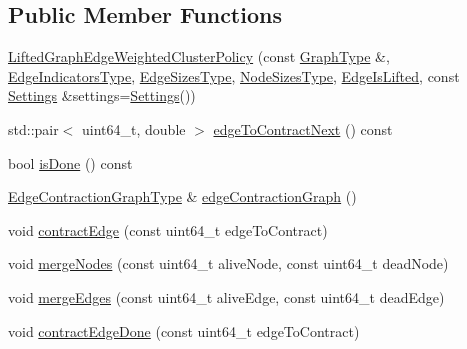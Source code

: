 \subsection*{Public Member Functions}
\begin{DoxyCompactItemize}
\item 
\hyperlink{classnifty_1_1graph_1_1agglo_1_1LiftedGraphEdgeWeightedClusterPolicy_ad92d9ecc1ef4cd9ae5766e996c48a024}{Lifted\+Graph\+Edge\+Weighted\+Cluster\+Policy} (const \hyperlink{classnifty_1_1graph_1_1agglo_1_1LiftedGraphEdgeWeightedClusterPolicy_ae3d069ea1fd066a37e1c816c0bf50b83}{Graph\+Type} \&, \hyperlink{classnifty_1_1graph_1_1agglo_1_1LiftedGraphEdgeWeightedClusterPolicy_ad0813aa75f1e76d10b794cab88615f61}{Edge\+Indicators\+Type}, \hyperlink{classnifty_1_1graph_1_1agglo_1_1LiftedGraphEdgeWeightedClusterPolicy_ad63cc4f759cd05f1bf9b7fec48629221}{Edge\+Sizes\+Type}, \hyperlink{classnifty_1_1graph_1_1agglo_1_1LiftedGraphEdgeWeightedClusterPolicy_a83ef319d77186be2fc3957ed06f0a8f1}{Node\+Sizes\+Type}, \hyperlink{classnifty_1_1graph_1_1agglo_1_1LiftedGraphEdgeWeightedClusterPolicy_ad104d8984e0964ccfb7d1ec06ee977a2}{Edge\+Is\+Lifted}, const \hyperlink{classnifty_1_1graph_1_1agglo_1_1LiftedGraphEdgeWeightedClusterPolicy_aeaf1751bd20abe54b45e4c9249cec518}{Settings} \&settings=\hyperlink{classnifty_1_1graph_1_1agglo_1_1LiftedGraphEdgeWeightedClusterPolicy_aeaf1751bd20abe54b45e4c9249cec518}{Settings}())
\item 
std\+::pair$<$ uint64\+\_\+t, double $>$ \hyperlink{classnifty_1_1graph_1_1agglo_1_1LiftedGraphEdgeWeightedClusterPolicy_ac27f4726c16aaa1f77b68a318a13d681}{edge\+To\+Contract\+Next} () const 
\item 
bool \hyperlink{classnifty_1_1graph_1_1agglo_1_1LiftedGraphEdgeWeightedClusterPolicy_a7e11bb64b33cf2123c48eb46d9feebf5}{is\+Done} () const 
\item 
\hyperlink{classnifty_1_1graph_1_1agglo_1_1LiftedGraphEdgeWeightedClusterPolicy_a316c395d0d3bcc00ddbed21302419354}{Edge\+Contraction\+Graph\+Type} \& \hyperlink{classnifty_1_1graph_1_1agglo_1_1LiftedGraphEdgeWeightedClusterPolicy_a95287f99bc3b86ccbed7dcd9c8851628}{edge\+Contraction\+Graph} ()
\item 
void \hyperlink{classnifty_1_1graph_1_1agglo_1_1LiftedGraphEdgeWeightedClusterPolicy_a56bc42922fcf00d486cfebca957c18ab}{contract\+Edge} (const uint64\+\_\+t edge\+To\+Contract)
\item 
void \hyperlink{classnifty_1_1graph_1_1agglo_1_1LiftedGraphEdgeWeightedClusterPolicy_a0a8e7d91a8393b6c9d350bc69305bedf}{merge\+Nodes} (const uint64\+\_\+t alive\+Node, const uint64\+\_\+t dead\+Node)
\item 
void \hyperlink{classnifty_1_1graph_1_1agglo_1_1LiftedGraphEdgeWeightedClusterPolicy_a033e17251eb1e313f930a53a3c73a002}{merge\+Edges} (const uint64\+\_\+t alive\+Edge, const uint64\+\_\+t dead\+Edge)
\item 
void \hyperlink{classnifty_1_1graph_1_1agglo_1_1LiftedGraphEdgeWeightedClusterPolicy_aa5bcb1829765b56a0fc10a82be501cc0}{contract\+Edge\+Done} (const uint64\+\_\+t edge\+To\+Contract)
\end{DoxyCompactItemize}
